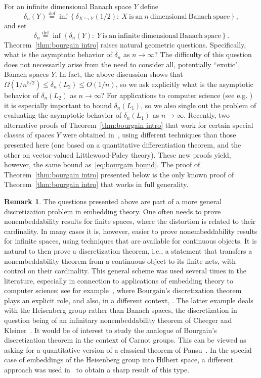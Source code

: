\documentclass[12pt,reqno]{amsart}
\theoremstyle{plain}
\theoremstyle{definition}
\newtheorem{remark}[definition]{Remark}
\newcommand{\eqdef}{\stackrel{\mathrm{def}}{=}}
\renewcommand{\d}{\delta}
\renewcommand{\le}{\leqslant}
\begin{document}
For an infinite dimensional Banach space $Y$ define
$$
\delta_n(Y)\eqdef\inf\left\{\d_{X\hookrightarrow Y}\left(1/2\right):\ X\ \mathrm{is\ an\ }n\ \mathrm{dimensional\ Banach\ space}\right\},
$$
and set
$$
\delta_n\eqdef \inf\left\{\d_n(Y):\ Y\ \mathrm{is\ an\ infinite\ dimensional\ Banach\ space}\right\}.
$$
Theorem~\ref{thm:bourgain intro} raises natural geometric questions. Specifically, what is the asymptotic behavior of $\delta_n$ as $n\to \infty$?  The difficulty of this question does not necessarily arise from the need to consider all, potentially ``exotic", Banach spaces $Y$. In fact, the above discussion shows that $\Omega(1/n^{5/2})\le \delta_n(L_2)\le O(1/n)$, so we ask explicitly what is the asymptotic behavior of $\delta_n(L_2)$ as $n\to \infty$? For applications to computer science (see e.g. \cite{NS07}) it is especially important to bound $\delta_n(L_1)$, so we also single out the problem of evaluating the asymptotic behavior of $\delta_n(L_1)$ as $n\to \infty$. Recently, two alternative proofs of Theorem~\ref{thm:bourgain intro} that work for certain special classes of spaces $Y$ were obtained in~\cite{LN11,HLN11}, using different techniques than those presented here (one based on a quantitative differentiation theorem, and the other on vector-valued Littlewood-Paley theory). These new proofs yield, however, the same bound as~\eqref{eq:bourgain bound}.  The proof of Theorem~\ref{thm:bourgain intro} presented below is the only known proof of Theorem~\ref{thm:bourgain intro} that works in full generality.





\begin{remark}
The questions presented above are part of a more general discretization problem in embedding theory. One often needs to prove nonembeddability results for finite spaces, where the distortion is related to their cardinality. In many cases it is, however, easier to prove nonembeddability results for infinite spaces, using techniques that are available for continuous objects. It is natural to then prove a discretization theorem, i.e., a statement that transfers a nonembeddability theorem from a continuous object to its finite nets, with control on their cardinality. This general scheme was used several times in the literature, especially in connection to applications of embedding theory to computer science; see for example~\cite{NS07}, where Bourgain's discretization theorem plays an explicit role, and also, in a different context, \cite{ckn}. The latter example deals with the Heisenberg group rather than Banach spaces, the discretization in question being of an infinitary nonembeddability theorem of Cheeger and Kleiner~\cite{CK10}. It would be of interest to study the analogue of Bourgain's discretization theorem in the context of Carnot groups. This can be viewed as asking for a quantitative version of a classical theorem of Pansu~\cite{Pan89}. In the special case of embeddings of the Heisenberg group into Hilbert space, a different approach was used in~\cite{ANT10} to obtain a sharp result of this type.
\end{remark}
\end{document}

